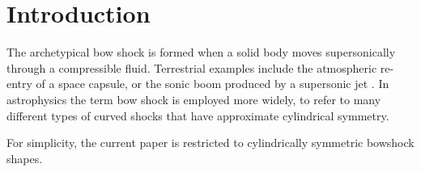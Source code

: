 \section{Introduction}
\label{sec:intro}


The archetypical bow shock is formed when a solid body moves
supersonically through a compressible fluid.  Terrestrial examples
include the atmospheric re-entry of a space capsule, or the sonic boom
produced by a supersonic jet \citep{van-Dyke:1982a}.  In astrophysics
the term bow shock is employed more widely, to refer to many different
types of curved shocks that have approximate cylindrical symmetry. 



For simplicity, the current paper is restricted to cylindrically
symmetric bowshock shapes. 

